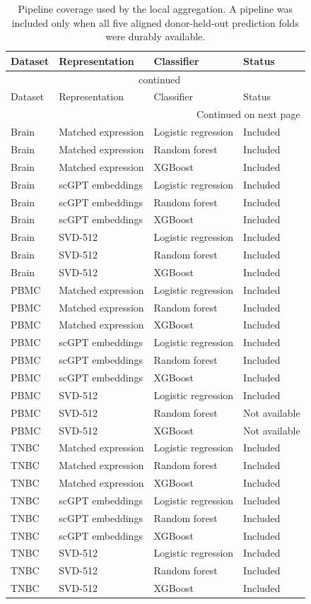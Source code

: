 {\footnotesize\setlength{\tabcolsep}{3pt}
\begin{longtable}{llll}
\caption{Pipeline coverage used by the local aggregation. A pipeline was included only when all five aligned donor-held-out prediction folds were durably available.}\label{tab:s-coverage}\\
\toprule
Dataset & Representation & Classifier & Status \\
\midrule
\endfirsthead
\multicolumn{4}{c}{\tablename\ \thetable{} continued}\\
\toprule
Dataset & Representation & Classifier & Status \\
\midrule
\endhead
\midrule
\multicolumn{4}{r}{Continued on next page}\\
\endfoot
\bottomrule
\endlastfoot
Brain & Matched expression & Logistic regression & Included \\
Brain & Matched expression & Random forest & Included \\
Brain & Matched expression & XGBoost & Included \\
Brain & scGPT embeddings & Logistic regression & Included \\
Brain & scGPT embeddings & Random forest & Included \\
Brain & scGPT embeddings & XGBoost & Included \\
Brain & SVD-512 & Logistic regression & Included \\
Brain & SVD-512 & Random forest & Included \\
Brain & SVD-512 & XGBoost & Included \\
PBMC & Matched expression & Logistic regression & Included \\
PBMC & Matched expression & Random forest & Included \\
PBMC & Matched expression & XGBoost & Included \\
PBMC & scGPT embeddings & Logistic regression & Included \\
PBMC & scGPT embeddings & Random forest & Included \\
PBMC & scGPT embeddings & XGBoost & Included \\
PBMC & SVD-512 & Logistic regression & Included \\
PBMC & SVD-512 & Random forest & Not available \\
PBMC & SVD-512 & XGBoost & Not available \\
TNBC & Matched expression & Logistic regression & Included \\
TNBC & Matched expression & Random forest & Included \\
TNBC & Matched expression & XGBoost & Included \\
TNBC & scGPT embeddings & Logistic regression & Included \\
TNBC & scGPT embeddings & Random forest & Included \\
TNBC & scGPT embeddings & XGBoost & Included \\
TNBC & SVD-512 & Logistic regression & Included \\
TNBC & SVD-512 & Random forest & Included \\
TNBC & SVD-512 & XGBoost & Included \\
\end{longtable}
}

